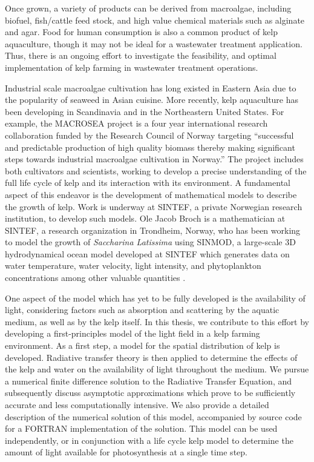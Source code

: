 Once grown, a variety of products can be derived from macroalgae, including biofuel, fish/cattle feed stock, and high value chemical materials such as alginate and agar.
Food for human consumption is also a common product of kelp aquaculture, though it may not be ideal for a wastewater treatment application.
Thus, there is an ongoing effort to investigate the feasibility, and optimal implementation of kelp farming in wastewater treatment operations. 

Industrial scale macroalgae cultivation has long existed in Eastern Asia due to the popularity of seaweed in Asian cuisine.
  More recently, kelp aquaculture has been developing in Scandinavia and in the Northeastern United States.
For example, the MACROSEA project is a four year international research collaboration funded by the Research Council of Norway targeting ``successful and predictable production of high quality biomass thereby making significant steps towards industrial macroalgae cultivation in Norway.'' %
The project includes both cultivators and scientists, working to develop a precise understanding of the full life cycle of kelp and its interaction with its environment.
A fundamental aspect of this endeavor is the development of mathematical models to describe the growth of kelp.
Work is underway at SINTEF, a private Norwegian research institution, to develop such models.
Ole Jacob Broch is a mathematician at SINTEF, a research organization in Trondheim, Norway, who has been working to model the growth of \textit{Saccharina Latissima} using SINMOD, a large-scale 3D hydrodynamical ocean model developed at SINTEF which generates data on water temperature, water velocity, light intensity, and phytoplankton concentrations among other valuable quantities \cite{wassmann_modelling_2006}.

One aspect of the model which has yet to be fully developed is the availability of light, considering factors such as absorption and scattering by the aquatic medium, as well as by the kelp itself.
In this thesis, we contribute to this effort by developing a first-principles model of the light field in a kelp farming environment.
As a first step, a model for the spatial distribution of kelp is developed.
Radiative transfer theory is then applied to determine the effects of the kelp and water on the availability of light throughout the medium.
We pursue a numerical finite difference solution to the Radiative Transfer Equation, and subsequently discuss asymptotic approximations which prove to be sufficiently accurate and less computationally intensive.
We also provide a detailed description of the numerical solution of this model, accompanied by source code for a FORTRAN implementation of the solution.
This model can be used independently, or in conjunction with a life cycle kelp model to determine the amount of light available for photosynthesis at a single time step.

